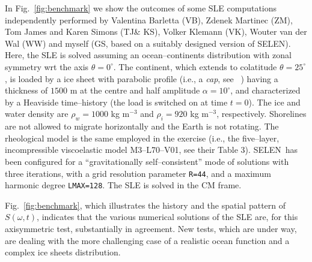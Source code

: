\documentclass[11pt,fleqn,a4paper,titlepage]{article}
\newcommand\selen{\textsf{SELEN~}}
\newcommand\selens{\textsf{SELEN}}
\begin{document}
In Fig.~\ref{fig:benchmark} we show the outcomes of some SLE computations independently performed by Valentina Barletta (VB),
Zdenek Martinec (ZM), Tom James and Karen Simons (TJ\& KS), Volker Klemann (VK), {Wouter van der Wal} (WW)
and myself (GS, based on a suitably designed version of \selens). Here, the SLE is solved assuming an ocean--continents distribution with zonal symmetry wrt the axis $\theta=0^\circ$. The continent, which extends to colatitude $\theta=25^\circ$, is loaded by a ice sheet with 
parabolic profile (i.e., a \textit{cap}, see \citeauthor{Spada_etal_2011}~\citeyear{Spada_etal_2011}) having a thickness of $1500$ m at the
centre and half amplitude $\alpha=10^\circ$, and characterized by a Heaviside time--history (the load is switched on at time $t=0$). The ice and water density are $\rho_w=1000$ kg m$^{-3}$ and $\rho_i =920$ kg m$^{-3}$, respectively. 
Shorelines are not allowed to migrate horizontally and the Earth is not rotating. The rheological model is the same employed in the \citet{Spada_etal_2011} exercise (i.e., the five--layer, incompressible viscoelastic model M3--L70--V01, see their Table 3). \selen has been configured for a ``gravitationally self--consistent'' mode of solutions with three
iterations, with a grid resolution parameter \texttt{R=44}, and a maximum harmonic degree \texttt{LMAX=128}. The SLE is
solved in the CM frame. 

Fig.~\ref{fig:benchmark}, which illustrates the history and the spatial pattern of $S(\omega,t)$, indicates that the various numerical solutions of the SLE are, for this axisymmetric test, substantially in agreement. New tests, which are under way, are
dealing with the
more challenging case of a realistic ocean function and a complex ice sheets distribution. 

\clearpage
\end{document}

